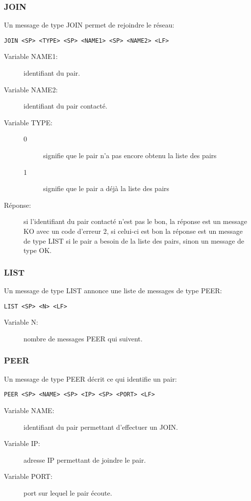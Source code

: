 \subsubsection*{JOIN}
Un message de type JOIN permet de rejoindre le réseau:
\begin{verbatim}
JOIN <SP> <TYPE> <SP> <NAME1> <SP> <NAME2> <LF>
\end{verbatim}
\begin{description}
\item[Variable NAME1:] identifiant du pair.
\item[Variable NAME2:] identifiant du pair contacté.
\item[Variable TYPE:]
  \begin{description}
  \item[0] signifie que le pair n'a pas encore obtenu la liste des pairs
  \item[1] signifie que le pair a déjà la liste des pairs
  \end{description}
\item[Réponse:] si l'identifiant du pair contacté n'est pas le bon, la
  réponse est un message KO avec un code d'erreur 2, si celui-ci est bon la
  réponse est un message de type LIST si le pair a besoin de la liste des
  pairs, sinon un message de type OK.
\end{description}

\subsubsection*{LIST}
Un message de type LIST annonce une liste de messages de type PEER:
\begin{verbatim}
LIST <SP> <N> <LF>
\end{verbatim}
\begin{description}
\item[Variable N:] nombre de messages PEER qui suivent.
\end{description}

\subsubsection*{PEER}
Un message de type PEER décrit ce qui identifie un pair:
\begin{verbatim}
PEER <SP> <NAME> <SP> <IP> <SP> <PORT> <LF>
\end{verbatim}
\begin{description}
\item[Variable NAME:] identifiant du pair permettant d'effectuer un JOIN.
\item[Variable IP:] adresse IP permettant de joindre le pair.
\item[Variable PORT:] port sur lequel le pair écoute.
\end{description}

